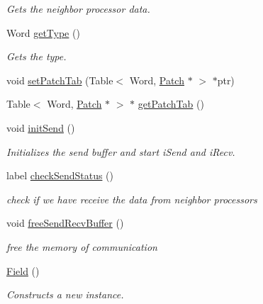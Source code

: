 \begin{DoxyCompactItemize}
\begin{DoxyCompactList}\small\item\em Gets the neighbor processor data. \item\end{DoxyCompactList}\item 
Word \hyperlink{classHSF_1_1Field_a43dc37894e37f158679ad2af096e8339}{getType} ()
\begin{DoxyCompactList}\small\item\em Gets the type. \item\end{DoxyCompactList}\item 
void \hyperlink{classHSF_1_1Field_aed5ee473bb4d75234e5ae9c73131a56a}{setPatchTab} (Table$<$ Word, \hyperlink{classHSF_1_1Patch}{Patch} $\ast$ $>$ $\ast$ptr)
\item 
Table$<$ Word, \hyperlink{classHSF_1_1Patch}{Patch} $\ast$ $>$ $\ast$ \hyperlink{classHSF_1_1Field_ae24798c8bdfd10a71f32cd7be92e570c}{getPatchTab} ()
\item 
void \hyperlink{classHSF_1_1Field_aeffce8b232389b100bb2408347c68943}{initSend} ()
\begin{DoxyCompactList}\small\item\em Initializes the send buffer and start iSend and iRecv. \item\end{DoxyCompactList}\item 
label \hyperlink{classHSF_1_1Field_a11428b9621735dae6b01939a480295a3}{checkSendStatus} ()
\begin{DoxyCompactList}\small\item\em check if we have receive the data from neighbor processors \item\end{DoxyCompactList}\item 
void \hyperlink{classHSF_1_1Field_a646bc44e3bd328d6b6ead58f91ae662c}{freeSendRecvBuffer} ()
\begin{DoxyCompactList}\small\item\em free the memory of communication \item\end{DoxyCompactList}\item 
\hyperlink{classHSF_1_1Field_a67ca23ee998b8ec6ff61de5f714db4d6}{Field} ()
\begin{DoxyCompactList}\small\item\em Constructs a new instance. \item\end{DoxyCompactList}\item 

\end{DoxyCompactItemize}
